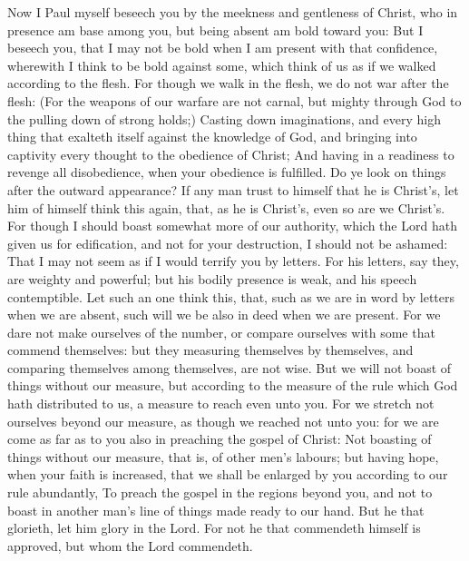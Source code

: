  Now I Paul myself beseech you by the meekness and
gentleness of Christ, who in presence am base among you, but being
absent am bold toward you:  But I beseech you, that I may
not be bold when I am present with that confidence, wherewith I think to
be bold against some, which think of us as if we walked according to the
flesh.  For though we walk in the flesh, we do not war
after the flesh:  (For the weapons of our warfare are not
carnal, but mighty through God to the pulling down of strong holds;)
 Casting down imaginations, and every high thing that
exalteth itself against the knowledge of God, and bringing into
captivity every thought to the obedience of Christ;  And
having in a readiness to revenge all disobedience, when your obedience
is fulfilled.  Do ye look on things after the outward
appearance? If any man trust to himself that he is Christ's, let him of
himself think this again, that, as he is Christ's, even so are we
Christ's.  For though I should boast somewhat more of our
authority, which the Lord hath given us for edification, and not for
your destruction, I should not be ashamed:  That I may not
seem as if I would terrify you by letters.  For his
letters, say they, are weighty and powerful; but his bodily presence is
weak, and his speech contemptible.  Let such an one think
this, that, such as we are in word by letters when we are absent, such
will we be also in deed when we are present.  For we dare
not make ourselves of the number, or compare ourselves with some that
commend themselves: but they measuring themselves by themselves, and
comparing themselves among themselves, are not wise.  But
we will not boast of things without our measure, but according to the
measure of the rule which God hath distributed to us, a measure to reach
even unto you.  For we stretch not ourselves beyond our
measure, as though we reached not unto you: for we are come as far as to
you also in preaching the gospel of Christ:  Not boasting
of things without our measure, that is, of other men's labours; but
having hope, when your faith is increased, that we shall be enlarged by
you according to our rule abundantly,  To preach the
gospel in the regions beyond you, and not to boast in another man's line
of things made ready to our hand.  But he that glorieth,
let him glory in the Lord.  For not he that commendeth
himself is approved, but whom the Lord commendeth.

